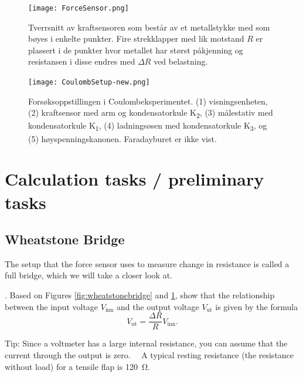 \documentclass[../Elmag-labhefte-2020.tex]{subfiles}
\begin{document}
\begin{figure}[!htbp]
    \centering
    \texttt{[image: ForceSensor.png]}
    \caption{%
        Tverrsnitt av kraftsensoren som består av et metallstykke med som bøyes i enkelte punkter. Fire strekklapper med lik motstand $R$ er plassert i de punkter hvor metallet har størst påkjenning og resistansen i disse endres med $\Delta R$ ved belastning.
    }
    \label{fig:ForceSensor}
\end{figure}

\begin{figure}[h!t]
    \centering
    \texttt{[image: CoulombSetup-new.png]}
    \vspace{-2mm}
    \caption{%
        Forsøksoppstillingen i Coulombeksperimentet. 
	        (1) visningsenheten, 
	        (2) kraftsensor med arm og kondensatorkule K\textsubscript{2}, 
	        (3) målestativ med kondensatorkule K\textsubscript{1}, 
	        (4) ladningsøsen med kondensatorkule K\textsubscript{3}, og
	        (5) høyspenningskanonen.
        Faradayburet er ikke vist.
     }
   \label{fig:CoulombSetUp_new}
\end{figure}

\clearpage


\section{Calculation tasks / preliminary tasks \label{ch.coulomb.beregn}}
\subsection{Wheatstone Bridge}
The setup that the force sensor uses to measure change in resistance is called a full bridge, which we will take a closer look at.

{. Based on Figures \ref{fig:wheatstonebridge} and \ref{fig:ForceSensor}, show that the relationship between the input voltage $V_\text{inn}$ and the output voltage $V_\text{ut}$ is given by the formula}
\begin{equation}
    \label{eq:fullbridge}
    V_\text{ut} = \frac{\Delta R}  {R} V_\text{inn} .
\end{equation}

Tip: Since a voltmeter has a large internal resistance, you can assume that the current through the output is zero. \ \
A typical resting resistance (the resistance without load) for a tensile flap is \SI{120}{\ohm}.
\end{document}
